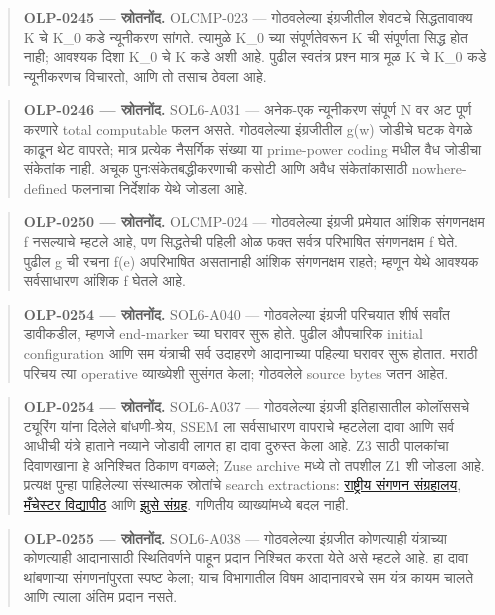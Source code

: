 \begin{quote}\small\textbf{OLP-0245 — स्रोतनोंद.} OLCMP-023 — गोठवलेल्या इंग्रजीतील शेवटचे सिद्धतावाक्य K चे K\_0 कडे न्यूनीकरण सांगते. त्यामुळे K\_0 च्या संपूर्णतेवरून K ची संपूर्णता सिद्ध होत नाही; आवश्यक दिशा K\_0 चे K कडे अशी आहे. पुढील स्वतंत्र प्रश्न मात्र मूळ K चे K\_0 कडे न्यूनीकरणच विचारतो, आणि तो तसाच ठेवला आहे.\end{quote}
\begin{quote}\small\textbf{OLP-0246 — स्रोतनोंद.} SOL6-A031 — अनेक-एक न्यूनीकरण संपूर्ण N वर अट पूर्ण करणारे total computable फलन असते. गोठवलेल्या इंग्रजीतील g(w) जोडीचे घटक वेगळे काढून थेट वापरते; मात्र प्रत्येक नैसर्गिक संख्या या prime-power coding मधील वैध जोडीचा संकेतांक नाही. अचूक पुनःसंकेतबद्धीकरणाची कसोटी आणि अवैध संकेतांकासाठी nowhere-defined फलनाचा निर्देशांक येथे जोडला आहे.\end{quote}
\begin{quote}\small\textbf{OLP-0250 — स्रोतनोंद.} OLCMP-024 — गोठवलेल्या इंग्रजी प्रमेयात आंशिक संगणनक्षम f नसल्याचे म्हटले आहे, पण सिद्धतेची पहिली ओळ फक्त सर्वत्र परिभाषित संगणनक्षम f घेते. पुढील g ची रचना f(e) अपरिभाषित असतानाही आंशिक संगणनक्षम राहते; म्हणून येथे आवश्यक सर्वसाधारण आंशिक f घेतले आहे.\end{quote}
\begin{quote}\small\textbf{OLP-0254 — स्रोतनोंद.} SOL6-A040 — गोठवलेल्या इंग्रजी परिचयात शीर्ष सर्वांत डावीकडील, म्हणजे end-marker च्या घरावर सुरू होते. पुढील औपचारिक initial configuration आणि सम यंत्राची सर्व उदाहरणे आदानाच्या पहिल्या घरावर सुरू होतात. मराठी परिचय त्या operative व्याख्येशी सुसंगत केला; गोठवलेले source bytes जतन आहेत.\end{quote}
\begin{quote}\small\textbf{OLP-0254 — स्रोतनोंद.} SOL6-A037 — गोठवलेल्या इंग्रजी इतिहासातील कोलॉससचे ट्यूरिंग यांना दिलेले बांधणी-श्रेय, SSEM ला सर्वसाधारण वापराचे म्हटलेला दावा आणि सर्व आधीची यंत्रे हाताने नव्याने जोडावी लागत हा दावा दुरुस्त केला आहे. Z3 साठी पालकांचा दिवाणखाना हे अनिश्चित ठिकाण वगळले; Zuse archive मध्ये तो तपशील Z1 शी जोडला आहे. प्रत्यक्ष पुन्हा पाहिलेल्या संस्थात्मक स्रोतांचे search extractions: \href{https://www.tnmoc.org/colossus}{राष्ट्रीय संगणन संग्रहालय}, \href{https://www.manchester.ac.uk/about/news/university-celebrates-babys-65th-birthday/}{मँचेस्टर विद्यापीठ} आणि \href{https://zuse.zib.de/z1}{झुसे संग्रह}. गणितीय व्याख्यांमध्ये बदल नाही.\end{quote}
\begin{quote}\small\textbf{OLP-0255 — स्रोतनोंद.} SOL6-A038 — गोठवलेल्या इंग्रजीत कोणत्याही यंत्राच्या कोणत्याही आदानासाठी स्थितिवर्णने पाहून प्रदान निश्चित करता येते असे म्हटले आहे. हा दावा थांबणाऱ्या संगणनांपुरता स्पष्ट केला; याच विभागातील विषम आदानावरचे सम यंत्र कायम चालते आणि त्याला अंतिम प्रदान नसते.\end{quote}
